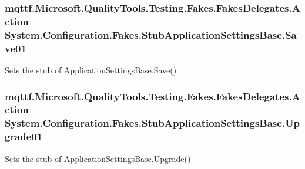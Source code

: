 \hypertarget{class_system_1_1_configuration_1_1_fakes_1_1_stub_application_settings_base_a323850a9c0f6f4a610b9306bcef5047e}{
\subsubsection[{Save01}]{\setlength{\rightskip}{0pt plus 5cm}mqttf.\-Microsoft.\-Quality\-Tools.\-Testing.\-Fakes.\-Fakes\-Delegates.\-Action System.\-Configuration.\-Fakes.\-Stub\-Application\-Settings\-Base.\-Save01}}\label{class_system_1_1_configuration_1_1_fakes_1_1_stub_application_settings_base_a323850a9c0f6f4a610b9306bcef5047e}


Sets the stub of Application\-Settings\-Base.\-Save()

\hypertarget{class_system_1_1_configuration_1_1_fakes_1_1_stub_application_settings_base_af7e73b396a6449ef992e68b67d56958d}{
\subsubsection[{Upgrade01}]{\setlength{\rightskip}{0pt plus 5cm}mqttf.\-Microsoft.\-Quality\-Tools.\-Testing.\-Fakes.\-Fakes\-Delegates.\-Action System.\-Configuration.\-Fakes.\-Stub\-Application\-Settings\-Base.\-Upgrade01}}\label{class_system_1_1_configuration_1_1_fakes_1_1_stub_application_settings_base_af7e73b396a6449ef992e68b67d56958d}


Sets the stub of Application\-Settings\-Base.\-Upgrade()



